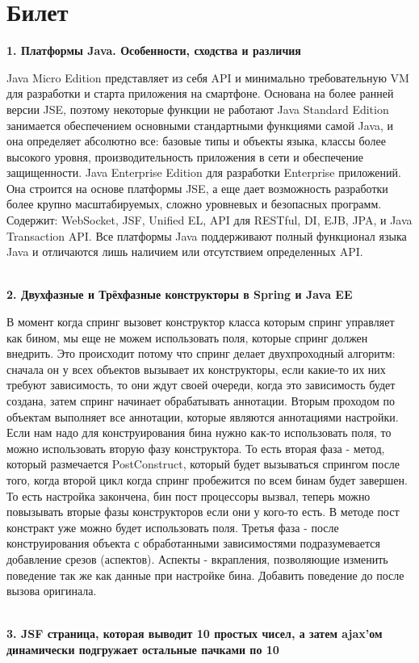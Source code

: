 \documentclass{article}
\newcommand{\bil}[5]{%
        \section{Билет}
        \textbf{1. #1}

        #4
        \\
        \textbf{2. #2}
        
        #5
        \\
        \textbf{3. #3}
}
\begin{document}
\bil{Платформы Java. Особенности, сходства и различия}
{Двухфазные и Трёхфазные конструкторы в Spring и Java EE}
{JSF страница, которая выводит 10 простых чисел, а затем ajax'ом динамически подгружает остальные пачками по 10}{
    Java Micro Edition представляет из себя API и минимально требовательную VM для разработки и старта приложения на смартфоне. Основана на более ранней версии JSE, поэтому некоторые функции не работают
    Java Standard Edition занимается обеспечением основными стандартными функциями самой Java, и она определяет абсолютно все: базовые типы и объекты языка, классы более высокого уровня, производительность приложения в сети и обеспечение защищенности.
    Java Enterprise Edition для разработки Enterprise приложений. Она строится на основе платформы JSE, а еще дает возможность разработки более крупно масштабируемых, сложно уровневых и безопасных программ. Содержит: WebSocket, JSF, Unified EL, API для RESTful, DI, EJB, JPA, и Java Transaction API.
    Все платформы Java поддерживают полный функционал языка Java и отличаются лишь наличием или отсутствием определенных API.
}{
    В момент когда спринг вызовет конструктор класса которым спринг управляет как бином, мы еще не можем использовать поля, которые спринг должен внедрить. Это происходит потому что спринг делает двухпроходный алгоритм: сначала он у всех объектов вызывает их конструкторы, если какие-то их них требуют зависимость, то они ждут своей очереди, когда это зависимость будет создана, затем спринг начинает обрабатывать аннотации. 
    Вторым проходом по объектам выполняет все аннотации, которые являются аннотациями настройки. Если нам надо для конструирования бина нужно как-то использовать поля, то можно использовать вторую фазу конструктора. 
    То есть вторая фаза - метод, который размечается PostConstruct, который будет вызываться спрингом после того, когда второй цикл когда спринг пробежится по всем бинам будет завершен. То есть настройка закончена, бин пост процессоры вызвал, теперь можно повызывать вторые фазы конструкторов если они у кого-то есть. В методе пост констракт уже можно будет использовать поля. 
    Третья фаза - после конструирования объекта с обработанными зависимостями подразумевается добавление срезов (аспектов). Аспекты - вкрапления, позволяющие изменить поведение так же как данные при настройке бина. Добавить поведение до после вызова оригинала.
}
\end{document}
